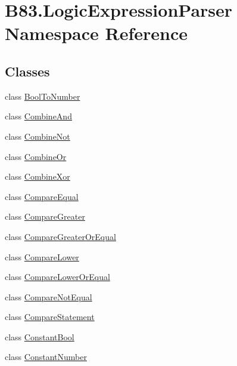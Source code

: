 \hypertarget{namespace_b83_1_1_logic_expression_parser}{}\section{B83.\+Logic\+Expression\+Parser Namespace Reference}
\label{namespace_b83_1_1_logic_expression_parser}
\subsection*{Classes}
\begin{DoxyCompactItemize}
\item 
class \hyperlink{class_b83_1_1_logic_expression_parser_1_1_bool_to_number}{Bool\+To\+Number}
\item 
class \hyperlink{class_b83_1_1_logic_expression_parser_1_1_combine_and}{Combine\+And}
\item 
class \hyperlink{class_b83_1_1_logic_expression_parser_1_1_combine_not}{Combine\+Not}
\item 
class \hyperlink{class_b83_1_1_logic_expression_parser_1_1_combine_or}{Combine\+Or}
\item 
class \hyperlink{class_b83_1_1_logic_expression_parser_1_1_combine_xor}{Combine\+Xor}
\item 
class \hyperlink{class_b83_1_1_logic_expression_parser_1_1_compare_equal}{Compare\+Equal}
\item 
class \hyperlink{class_b83_1_1_logic_expression_parser_1_1_compare_greater}{Compare\+Greater}
\item 
class \hyperlink{class_b83_1_1_logic_expression_parser_1_1_compare_greater_or_equal}{Compare\+Greater\+Or\+Equal}
\item 
class \hyperlink{class_b83_1_1_logic_expression_parser_1_1_compare_lower}{Compare\+Lower}
\item 
class \hyperlink{class_b83_1_1_logic_expression_parser_1_1_compare_lower_or_equal}{Compare\+Lower\+Or\+Equal}
\item 
class \hyperlink{class_b83_1_1_logic_expression_parser_1_1_compare_not_equal}{Compare\+Not\+Equal}
\item 
class \hyperlink{class_b83_1_1_logic_expression_parser_1_1_compare_statement}{Compare\+Statement}
\item 
class \hyperlink{class_b83_1_1_logic_expression_parser_1_1_constant_bool}{Constant\+Bool}
\item 
class \hyperlink{class_b83_1_1_logic_expression_parser_1_1_constant_number}{Constant\+Number}

\end{DoxyCompactItemize}
